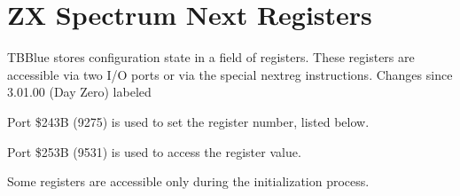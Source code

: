 \section{ZX Spectrum Next Registers}
TBBlue stores configuration state in a field of registers. These
registers are accessible via two I/O ports or via the special nextreg
instructions. Changes since 3.01.00 (Day Zero) labeled

Port \$243B (9275) is used to set the register number, listed below.

Port \$253B (9531) is used to access the register value.

Some registers are accessible only during the initialization process.

